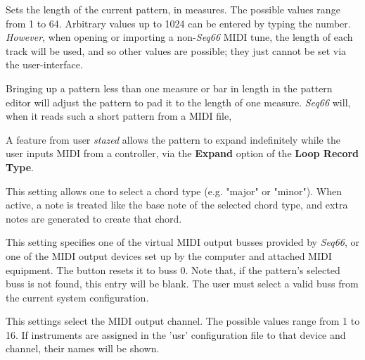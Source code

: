    Sets the length of the current pattern, in measures.
   The possible values range from 1 to 64.
   Arbitrary values up to 1024 can be entered by typing the number.
   \textsl{However}, when opening or importing a non-\textsl{Seq66}
   MIDI tune, the length of each track will be used, and so other values
   are possible; they just cannot be set via the user-interface.


   Bringing up a pattern less than one measure or bar in
   length in the pattern editor will adjust the pattern to pad it to the
   length of one measure.
   \textsl{Seq66} will, when it reads such a short pattern
   from a MIDI file,

   A feature from user \textsl{stazed} allows the pattern to expand
   indefinitely while the user inputs MIDI from a controller, via the
   \textbf{Expand} option of the \textbf{Loop Record Type}.

%

   This setting allows one to select a chord type (e.g. "major" or "minor").
   When active, a note is treated like the base note of the selected chord
   type, and extra notes are generated to create that chord.

   This setting specifies one of the virtual MIDI output busses provided by
   \textsl{Seq66}, or one of the MIDI output devices set up by the computer and
   attached MIDI equipment.
   The button resets it to buss 0.
   Note that, if the pattern's selected buss is not found, this entry will be
   blank.  The user must select a valid buss from the current system
   configuration.


   This settings select the MIDI output channel.
   The possible values range from 1 to 16.
   If instruments are assigned in the 'usr' configuration file
   to that device and channel, their names will be shown.

